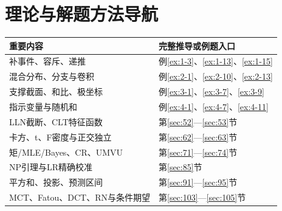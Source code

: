 \section{理论与解题方法导航}
\begin{longtable}{@{}p{}p{}@{}}\toprule
重要内容&完整推导或例题入口\\\midrule\endhead
补事件、容斥、递推&例\ref{ex:1-3}、\ref{ex:1-13}、\ref{ex:1-15}\\
混合分布、分支与卷积&例\ref{ex:2-1}、\ref{ex:2-10}、\ref{ex:2-13}\\
支撑截面、和比、极坐标&例\ref{ex:3-1}、\ref{ex:3-7}、\ref{ex:3-9}\\
指示变量与随机和&例\ref{ex:4-1}、\ref{ex:4-7}、\ref{ex:4-11}\\
LLN截断、CLT特征函数&第\ref{sec:52}—\ref{sec:53}节\\
卡方、t、F密度与正交独立&第\ref{sec:62}—\ref{sec:63}节\\
矩/MLE/Bayes、CR、UMVU&第\ref{sec:71}—\ref{sec:74}节\\
NP引理与LR精确校准&第\ref{sec:85}节\\
平方和、投影、预测区间&第\ref{sec:91}—\ref{sec:95}节\\
MCT、Fatou、DCT、RN与条件期望&第\ref{sec:103}—\ref{sec:105}节\\\bottomrule
\end{longtable}
